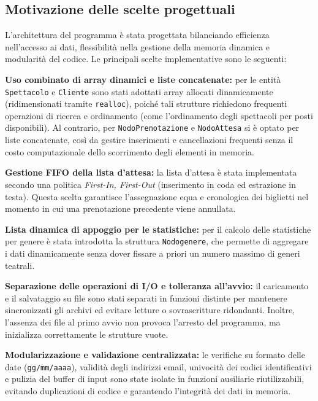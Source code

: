 \documentclass[11pt,a4paper,oneside,openany]{book}
\newenvironment{listacomp}{%
    \small
    \begin{list}{\textendash}{%
        \setlength{\topsep}{2pt}%
        \setlength{\partopsep}{0pt}%
        \setlength{\itemsep}{1pt}%
        \setlength{\parsep}{0pt}%
        \setlength{\leftmargin}{1.2em}%
    }%
}{%
    \end{list}%
}
\begin{document}
\subsection{Motivazione delle scelte progettuali}
L'architettura del programma è stata progettata bilanciando efficienza nell'accesso ai dati, flessibilità nella gestione della memoria dinamica e modularità del codice. Le principali scelte implementative sono le seguenti:
\begin{listacomp}
    \item \textbf{Uso combinato di array dinamici e liste concatenate:} per le entità \texttt{Spettacolo} e \texttt{Cliente} sono stati adottati array allocati dinamicamente (ridimensionati tramite \texttt{realloc}), poiché tali strutture richiedono frequenti operazioni di ricerca e ordinamento (come l'ordinamento degli spettacoli per posti disponibili). Al contrario, per \texttt{NodoPrenotazione} e \texttt{NodoAttesa} si è optato per liste concatenate, così da gestire inserimenti e cancellazioni frequenti senza il costo computazionale dello scorrimento degli elementi in memoria.
    \item \textbf{Gestione FIFO della lista d'attesa:} la lista d'attesa è stata implementata secondo una politica \emph{First-In, First-Out} (inserimento in coda ed estrazione in testa). Questa scelta garantisce l'assegnazione equa e cronologica dei biglietti nel momento in cui una prenotazione precedente viene annullata.
    \item \textbf{Lista dinamica di appoggio per le statistiche:} per il calcolo delle statistiche per genere è stata introdotta la struttura \texttt{Nodogenere}, che permette di aggregare i dati dinamicamente senza dover fissare a priori un numero massimo di generi teatrali.
    \item \textbf{Separazione delle operazioni di I/O e tolleranza all'avvio:} il caricamento e il salvataggio su file sono stati separati in funzioni distinte per mantenere sincronizzati gli archivi ed evitare letture o sovrascritture ridondanti. Inoltre, l'assenza dei file al primo avvio non provoca l'arresto del programma, ma inizializza correttamente le strutture vuote.
    \item \textbf{Modularizzazione e validazione centralizzata:} le verifiche su formato delle date (\texttt{gg/mm/aaaa}), validità degli indirizzi email, univocità dei codici identificativi e pulizia del buffer di input sono state isolate in funzioni ausiliarie riutilizzabili, evitando duplicazioni di codice e garantendo l'integrità dei dati in memoria.
\end{listacomp}
\end{document}
